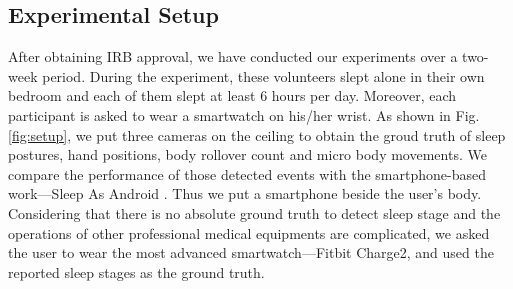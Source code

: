 \subsection{Experimental Setup}
After obtaining IRB approval, we have conducted our experiments over a two-week period. During the experiment, these volunteers slept alone in their own bedroom and each of them slept at least 6 hours per day. Moreover, each participant is asked to wear a smartwatch on his/her wrist. As shown in Fig. \ref{fig:setup}, we put three cameras on the ceiling to obtain the groud truth of sleep postures, hand positions, body rollover count and micro body movements. We compare the performance of those detected events with the smartphone-based work---Sleep As Android \cite{SleepAndroid}. Thus we put a smartphone beside
the user's body. Considering that there is no absolute ground truth to detect sleep stage and the operations of other professional medical equipments are complicated, we asked the user to wear the most advanced smartwatch---Fitbit Charge2, and used the reported sleep stages as the ground truth.  
